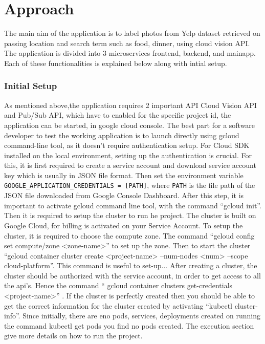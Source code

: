 \section{Approach}

The main aim of the application is to label photos from Yelp dataset
retrieved on passing location and search term such as food, dinner,
using cloud vision API. The application is divided into 3
microservices frontend, backend, and mainapp. Each of these
functionalities is explained below along with intial setup.

\subsubsection{Initial Setup}

As mentioned above,the application requires 2 important API Cloud
Vision API and Pub/Sub API, which have to enabled for the specific
project id, the application can be started, in google cloud
console. The best part for a software developer to test the working
application is to launch directly using gcloud command-line tool, as
it doesn’t require authentication setup.  For Cloud SDK installed on
the local environment, setting up the authentication is crucial. For
this, it is first required to create a service account and download
service account key which is usually in JSON file format. Then set the
environment variable \verb|GOOGLE_APPLICATION_CREDENTIALS = [PATH]|,
where \verb|PATH| is the file path of the JSON file downloaded from
Google Console Dashboard. After this step, it is important to activate
gcloud command line tool, with the command ``gcloud init''. Then it is
required to setup the cluster to run he project.  The cluster is built
on Google Cloud, for billing is activated on your Service Account. To
setup the cluster, it is required to choose the compute zone. The
command ``gcloud config set compute/zone <zone-name>'' to set up the
zone. Then to start the cluster ``gcloud container cluster create
<project-name> --num-nodes <num> --scope cloud-platform''. This
command is useful to set-up... After creating a cluster, the cluster
should be authorized with the service account, in order to get access
to all the api's. Hence the command `` gcloud container clusters
get-credentials <project-name>'' . If the cluster is perfectly created
then you should be able to get the correct information for the cluster
created by activating ``kubectl cluster-info''. Since initially, there
are eno pods, services, deployments created on running the command
kubectl get pods you find no pods created. The execution section give
more details on how to run the project.

